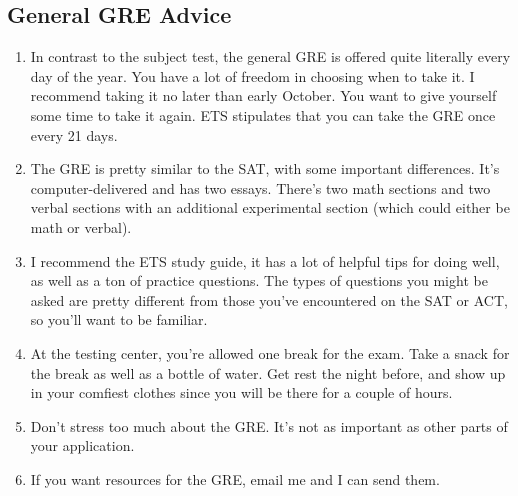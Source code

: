 \documentclass[12pt]{article}
\begin{document}
\subsection{General GRE Advice}
\begin{enumerate}
\item In contrast to the subject test, the general GRE is offered quite literally every day of the year. You have a lot of freedom in choosing when to take it. I recommend taking it no later than early October. You want to give yourself some time to take it again. ETS stipulates that you can take the GRE once every 21 days.

\item The GRE is pretty similar to the SAT, with some important differences. It's computer-delivered and has two essays. There's two math sections and two verbal sections with an additional experimental section (which could either be math or verbal). 

\item I recommend the ETS study guide, it has a lot of helpful tips for doing well, as well as a ton of practice questions. The types of questions you might be asked are pretty different from those you've encountered on the SAT or ACT, so you'll want to be familiar.

\item At the testing center, you're allowed one break for the exam. Take a snack for the break as well as a bottle of water. Get rest the night before, and show up in your comfiest clothes since you will be there for a couple of hours.

\item Don't stress too much about the GRE. It's not as important as other parts of your application.

\item If you want resources for the GRE, email me and I can send them.

\end{enumerate}
\end{document}
